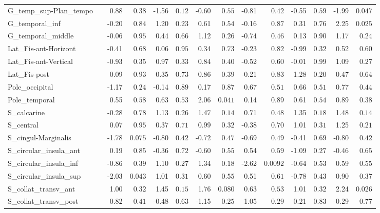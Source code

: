 {\begin{longtable}{llrrrrrrrrrrrr}
G\_temp\_sup-Plan\_tempo &  & 0.88 & $0.38$ & -1.56 & $0.12$ & -0.60 & $0.55$ & -0.81 & $0.42$ & -0.55 & $0.59$ & -1.99 & $0.047$ \\
G\_temporal\_inf &  & -0.20 & $0.84$ & 1.20 & $0.23$ & 0.61 & $0.54$ & -0.16 & $0.87$ & 0.31 & $0.76$ & 2.25 & $0.025$ \\
G\_temporal\_middle &  & -0.06 & $0.95$ & 0.44 & $0.66$ & 1.12 & $0.26$ & -0.74 & $0.46$ & 0.13 & $0.90$ & 1.17 & $0.24$ \\
Lat\_Fis-ant-Horizont &  & -0.41 & $0.68$ & 0.06 & $0.95$ & 0.34 & $0.73$ & -0.23 & $0.82$ & -0.99 & $0.32$ & 0.52 & $0.60$ \\
Lat\_Fis-ant-Vertical &  & -0.93 & $0.35$ & 0.97 & $0.33$ & 0.84 & $0.40$ & -0.52 & $0.60$ & -0.01 & $0.99$ & 1.09 & $0.27$ \\
Lat\_Fis-post &  & 0.09 & $0.93$ & 0.35 & $0.73$ & 0.86 & $0.39$ & -0.21 & $0.83$ & 1.28 & $0.20$ & 0.47 & $0.64$ \\
Pole\_occipital &  & -1.17 & $0.24$ & -0.14 & $0.89$ & 0.17 & $0.87$ & 0.67 & $0.51$ & 0.66 & $0.51$ & 0.77 & $0.44$ \\
Pole\_temporal &  & 0.55 & $0.58$ & 0.63 & $0.53$ & 2.06 & $0.041$ & 0.14 & $0.89$ & 0.61 & $0.54$ & 0.89 & $0.38$ \\
S\_calcarine &  & -0.28 & $0.78$ & 1.13 & $0.26$ & 1.47 & $0.14$ & 0.71 & $0.48$ & 1.35 & $0.18$ & 1.48 & $0.14$ \\
S\_central &  & 0.07 & $0.95$ & 0.37 & $0.71$ & 0.99 & $0.32$ & -0.38 & $0.70$ & 1.01 & $0.31$ & 1.25 & $0.21$ \\
S\_cingul-Marginalis &  & -1.78 & $0.075$ & -0.80 & $0.42$ & -0.72 & $0.47$ & -0.69 & $0.49$ & -0.41 & $0.69$ & -0.80 & $0.42$ \\
S\_circular\_insula\_ant &  & 0.19 & $0.85$ & -0.36 & $0.72$ & -0.60 & $0.55$ & 0.54 & $0.59$ & -1.09 & $0.27$ & -0.46 & $0.65$ \\
S\_circular\_insula\_inf &  & -0.86 & $0.39$ & 1.10 & $0.27$ & 1.34 & $0.18$ & -2.62 & $0.0092$ & -0.64 & $0.53$ & 0.59 & $0.55$ \\
S\_circular\_insula\_sup &  & -2.03 & $0.043$ & 1.01 & $0.31$ & 0.60 & $0.55$ & 0.51 & $0.61$ & -0.78 & $0.43$ & 0.90 & $0.37$ \\
S\_collat\_transv\_ant &  & 1.00 & $0.32$ & 1.45 & $0.15$ & 1.76 & $0.080$ & 0.63 & $0.53$ & 1.01 & $0.32$ & 2.24 & $0.026$ \\
S\_collat\_transv\_post &  & 0.82 & $0.41$ & -0.48 & $0.63$ & -1.15 & $0.25$ & 1.05 & $0.29$ & 0.21 & $0.83$ & -0.29 & $0.77$ \\

\end{longtable}}
